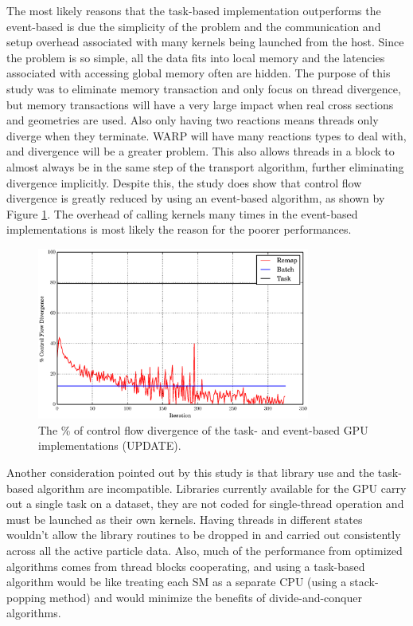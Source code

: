 The most likely reasons that the task-based implementation outperforms the event-based is due the simplicity of the problem and the communication and setup overhead associated with many kernels being launched from the host.  Since the problem is so simple, all the data fits into local memory and the latencies associated with accessing global memory often are hidden.  The purpose of this study was to eliminate memory transaction and only focus on thread divergence, but memory transactions will have a very large impact when real cross sections and geometries are used.  Also only having two reactions means threads only diverge when they terminate.  WARP will have many reactions types to deal with, and divergence will be a greater problem.  This also allows threads in a block to almost always be in the same step of the transport algorithm, further eliminating divergence implicitly.  Despite this, the study does show that control flow divergence is greatly reduced by using an event-based algorithm, as shown by Figure \ref{prelim_divergence}.  The overhead of calling kernels many times in the event-based implementations is most likely the reason for the poorer performances.

\begin{figure}[h!] 
  \centering
    \includegraphics[width=0.8\textwidth]{graphics/prelim_divergence.eps}
     \caption{The \% of control flow divergence of the task- and event-based GPU implementations (UPDATE). \label{prelim_divergence} }
\end{figure}

Another consideration pointed out by this study is that library use and the task-based algorithm are incompatible.  Libraries currently available for the GPU carry out a single task on a dataset, they are not coded for single-thread operation and must be launched as their own kernels.  Having threads in different states wouldn't allow the library routines to be dropped in and carried out consistently across all the active particle data.  Also, much of the performance from optimized algorithms comes from thread blocks cooperating, and using a task-based algorithm would be like treating each SM as a separate CPU (using a stack-popping method) and would minimize the benefits of divide-and-conquer algorithms.

